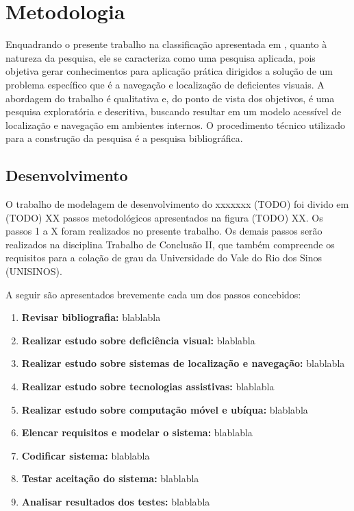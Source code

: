 \documentclass[english,brazilian]{UNISINOSmonografia}
\begin{document}
\chapter{Metodologia}
Enquadrando o presente trabalho na classificação apresentada em , quanto à natureza da pesquisa, ele se caracteriza como uma pesquisa aplicada, pois objetiva gerar conhecimentos para aplicação prática dirigidos a solução de um problema específico que é a navegação e localização de deficientes visuais. A abordagem do trabalho é qualitativa e, do ponto de vista dos objetivos, é uma pesquisa exploratória e descritiva, buscando resultar em um modelo acessível de localização e navegação em ambientes internos. O procedimento técnico utilizado para a construção da pesquisa é a pesquisa bibliográfica.

	\section{Desenvolvimento}
O trabalho de modelagem de desenvolvimento do xxxxxxx (TODO) foi divido em (TODO) XX passos metodológicos apresentados na figura (TODO) XX. Os passos 1 a X foram realizados no presente trabalho. Os demais passos serão realizados na disciplina Trabalho de Conclusão II, que também compreende os requisitos para a colação de grau da Universidade do Vale do Rio dos Sinos (UNISINOS).

A seguir são apresentados brevemente cada um dos passos concebidos:

\begin{enumerate}
	\item \textbf{Revisar bibliografia:} blablabla
    \item \textbf{Realizar estudo sobre deficiência visual:} blablabla
    \item \textbf{Realizar estudo sobre sistemas de localização e navegação:} blablabla
    \item \textbf{Realizar estudo sobre tecnologias assistivas:} blablabla
    \item \textbf{Realizar estudo sobre computação móvel e ubíqua:} blablabla
    \item \textbf{Elencar requisitos e modelar o sistema:} blablabla
    \item \textbf{Codificar sistema:} blablabla
	\item \textbf{Testar aceitação do sistema:} blablabla	
	\item \textbf{Analisar resultados dos testes:} blablabla
\end{enumerate}
\end{document}
